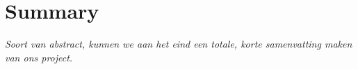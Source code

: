 \section{Summary}
\emph{Soort van abstract, kunnen we aan het eind een totale, korte samenvatting maken van ons project.}